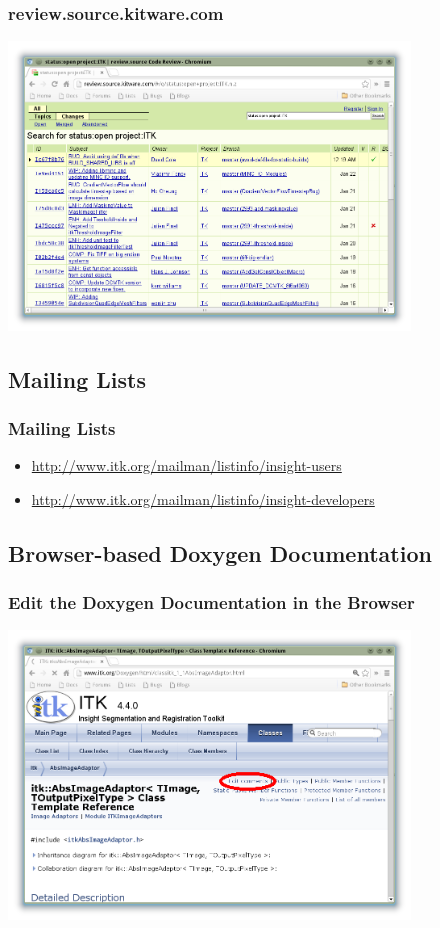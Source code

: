 \begin{frame}
  \frametitle{review.source.kitware.com}
  \includegraphics[width=0.8\textwidth]{../Art/GerritCodeReview.png}
\end{frame}

\subsection{Mailing Lists}

\begin{frame}
  \frametitle{Mailing Lists}
  \begin{itemize}
    \item \url{http://www.itk.org/mailman/listinfo/insight-users}
    \item \url{http://www.itk.org/mailman/listinfo/insight-developers}
  \end{itemize}
\end{frame}

\subsection{Browser-based Doxygen Documentation}

\begin{frame}
  \frametitle{Edit the Doxygen Documentation in the Browser}
  \includegraphics[width=0.8\textwidth]{../Art/Doxygen1.png}
\end{frame}

